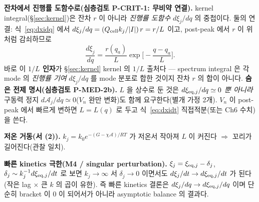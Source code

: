 \textbf{잔차에서 진행률 도함수로(심층검토 P-CRIT-1: 무비약 연결).} kernel integral(\S\ref{sec:kernel})은
잔차 $r$ 이 아니라 \emph{진행률 도함수} $d\xi_j/dq$ 의 중첩이다. 둘의 연결: 식~\eqref{eq:dxidq} 에서
$d\xi_j/dq=(Q_{\mathrm{cell}} k_j/|I|)\,r=r/L$ 이고, post-peak 에서 $r$ 이 위처럼 감쇠하므로
\begin{equation}
\frac{d\xi_j}{dq}=\frac{r(q_a)}{L}\exp\!\Big[-\frac{q-q_a}{L}\Big].
\label{eq:single_dxidq}
\end{equation}
바로 이 \textbf{$1/L$ 인자}가 \S\ref{sec:kernel} kernel 의 $1/L$ 출처다 — spectrum integral 은 각 mode 의
\emph{진행률 기여} $d\xi_j/dq$ 를 mode 분포로 합한 것이지 잔차 $r$ 의 합이 아니다.
\textbf{숨은 전제 명시(심층검토 P-MED-2b).} $L$ 을 상수로 둔 것은 $d\xi_{\mathrm{eq},j}/dq\simeq0$ \emph{뿐 아니라}
구동력 정지 $d\mathcal A_j/dq\simeq0$($V_n$ 완만 변화)도 함께 요구한다(별개 가정 2개). $V_n$ 이 post-peak
에서 빠르게 변하면 $L=L(q)$ 로 두고 식~\eqref{eq:dxidt} 직접적분(또는 Ch6 수치)을 쓴다.

\textbf{저온 거동(서 (2)).} $k_j=k_0e^{-(G-\chi\mathcal A)/RT}$ 가 저온서 작아져 $L$ 이 커진다
$\Rightarrow$ 꼬리가 길어진다(관찰 일치).

\textbf{빠른 kinetics 극한(M4 / singular perturbation).} $\xi_j=\xi_{\mathrm{eq},j}-\delta_j$,
$\delta_j\sim k_j^{-1}d\xi_{\mathrm{eq},j}/dt$ 로 보면 $k_j\to\infty$ 서 $\delta_j\to0$ 이면서도
$d\xi_j/dt\to d\xi_{\mathrm{eq},j}/dt$ 가 된다(작은 lag $\times$ 큰 $k$ 의 곱이 유한). 즉 빠른 kinetics 결론은
$d\xi_j/dq\to d\xi_{\mathrm{eq},j}/dq$ 이며 단순히 bracket 이 0 이 되어서가 아니라 asymptotic balance 의 결과다.

